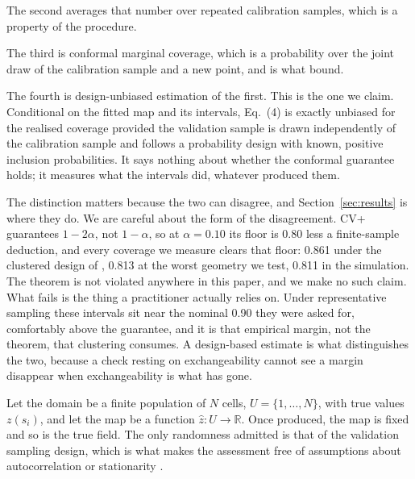 \documentclass[preprint,12pt,authoryear]{elsarticle}
\begin{document}
The second averages that number over repeated calibration samples, which is a
property of the procedure.

The third is conformal marginal coverage, which is a probability over the joint
draw of the calibration sample and a new point, and is what
\citet{barber2021} bound.

The fourth is design-unbiased estimation of the first. This is the one we claim.
Conditional on the fitted map and its intervals, Eq.~(4) is exactly unbiased for
the realised coverage provided the validation sample is drawn independently of
the calibration sample and follows a probability design with known, positive
inclusion probabilities. It says nothing about whether the conformal guarantee
holds; it measures what the intervals did, whatever produced them.

The distinction matters because the two can disagree, and
Section~\ref{sec:results} is where they do. We are careful about the form of
the disagreement. CV+ guarantees $1-2\alpha$, not $1-\alpha$, so at
$\alpha=0.10$ its floor is 0.80 less a finite-sample deduction, and every
coverage we measure clears that floor: 0.861 under the clustered design of
\citet{wadoux2021}, 0.813 at the worst geometry we test, 0.811 in the
simulation. The theorem is not violated anywhere in this paper, and we make no
such claim. What fails is the thing a practitioner actually relies on. Under
representative sampling these intervals sit near the nominal 0.90 they were
asked for, comfortably above the guarantee, and it is that empirical margin,
not the theorem, that clustering consumes. A design-based estimate is what
distinguishes the two, because a check resting on exchangeability cannot see a
margin disappear when exchangeability is what has gone.



Let the domain be a finite population of $N$ cells, $U=\{1,\dots,N\}$, with true
values $z(s_i)$, and let the map be a function $\hat z: U \rightarrow
\mathbb{R}$. Once produced, the map is fixed and so is the true field. The only
randomness admitted is that of the validation sampling design, which is what
makes the assessment free of assumptions about autocorrelation or stationarity
\citep{degruijter2006,brus2011}.
\end{document}

